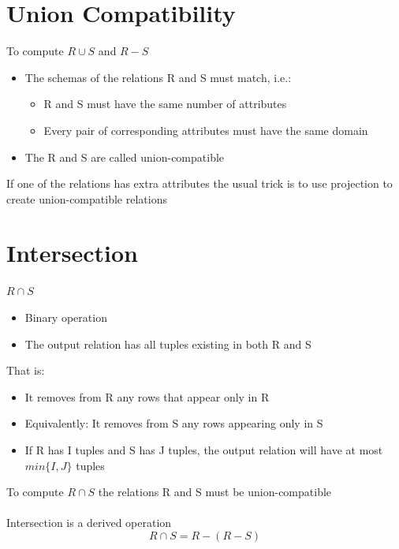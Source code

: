 \documentclass{article}[18pt]
\begin{document}
\section{Union Compatibility}
To compute $R\cup S$ and $R-S$
\begin{itemize}
	\item The schemas of the relations R and S must match, i.e.:
	\begin{itemize}
		\item R and S must have the same number of attributes
		\item Every pair of corresponding attributes must have the same domain
	\end{itemize}
	\item The R and S are called union-compatible
\end{itemize}
If one of the relations has extra attributes the usual trick is to use projection to create union-compatible relations
\section{Intersection}
$R\cap S$
\begin{itemize}
	\item Binary operation
	\item The output relation has all tuples existing in both R and S
\end{itemize}
That is:
\begin{itemize}
	\item It removes from R any rows that appear only in R
	\item Equivalently: It removes from S any rows appearing only in S
	\item If R has I tuples and S has J tuples, the output relation will have at most $min\{I,J\}$ tuples
\end{itemize}
To compute $R\cap S$ the relations R and S must be union-compatible\\
\\
Intersection is a derived operation
$$R\cap S=R-(R-S)$$
\end{document}
